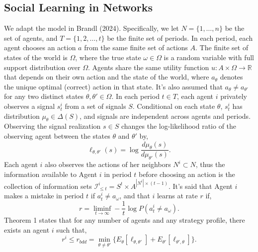 \subsection*{Social Learning in Networks}

We adapt the model in Brandl (2024). Specifically, we let $N = \{1, \ldots, n\}$ be the set of agents, and $T = \{1, 2, \ldots, t \}$ be the finite set of periods. In each period, each agent chooses an action $a$ from the same finite set of actions $A$. The finite set of states of the world is $\Omega$, where the true state $\omega \in \Omega$ is a random variable with full support distribution over $\Omega$. Agents share the same utility function $u : A \times \Omega \to \mathbb{R}$ that depends on their own action and the state of the world, where $a_\theta$ denotes the unique optimal (correct) action in that state. It's also assumed that $a_\theta \neq a_{\theta'}$ for any two distinct states $\theta, \theta' \in \Omega$. In each period $t \in T$, each agent $i$ privately observes a signal $s_t^i$ from a set of signals $S$. Conditional on each state $\theta$, $s_t^i$ has distribution $\mu_\theta \in \Delta(S)$, and signals are independent across agents and periods. Observing the signal realization $s \in S$ changes the log-likelihood ratio of the observing agent between the states $\theta$ and $\theta'$ by,
\[
\ell_{\theta, \theta'}(s) = \log \frac{d\mu_\theta(s)}{d\mu_{\theta'}(s)}.
\]
Each agent $i$ also observes the actions of her neighbors $N^i \subset N$, thus the information available to Agent $i$ in period $t$ before choosing an action is the collection of information sets $\mathcal{I}^i_{\leq t} = S^t \times A^{|N^i| \times (t-1)}$. It's said that Agent $i$ makes a mistake in period $t$ if $a_t^i \neq a_\omega$, and that $i$ learns at rate $r$ if,
\[
r = \liminf_{t \to \infty} -\frac{1}{t} \log P(a_t^i \neq a_\omega).
\]
Theorem 1 states that for any number of agents and any strategy profile, there exists an agent $i$ such that,
\[r^i \leq r_{bdd} = \min_{\theta \neq \theta'}\{E_\theta[\ell_{\theta,\theta'}] + E_{\theta'}[\ell_{\theta',\theta}]\}.\]


